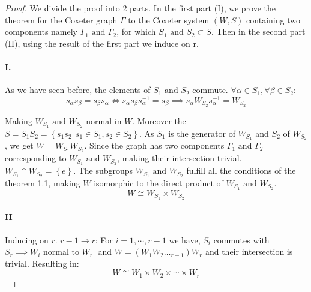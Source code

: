 \documentclass[11pt]{article}
\theoremstyle{plain}
\begin{document}
\begin{proof}
	We divide the proof into 2 parts. In the first part (I), we prove the theorem for the Coxeter graph $ \Gamma $  to the Coxeter system 
	$ \left( W,S \right) $ containing two components namely $ \Gamma_1 \text{ and } \Gamma_2 $, for which $ S_1 \text{ and } S_2 \subset S $.
	Then in the second part (II), using the result of the first part we induce on r. 
\paragraph{I.} As we have seen before, the elements of $ S_1 \text{ and } S_2 $ commute. $ \forall \alpha \in S_1, \forall \beta \in S_2: $
	$$
	s_{\alpha } s_{\beta } = s_{\beta } s_{\alpha } \iff s_{\alpha } s_{\beta } s_{\alpha }^{-1} = s_{\beta } \implies 
	s_{\alpha } W_{S_2} s_{\alpha }^{-1} = W_{S_2}
	$$

Making $ W_{S_1} \text{ and } W_{S_2}  $ normal in $ W $. Moreover the $ S = S_1S_2 = \left\{ 
	s_1 s_2 |\, s_1 \in S_1, s_2 \in S_2\right\}  $. As $ S_1 $ is the generator of $ W_{S_1} $ and $ S_2 $ of $ W_{S_2} $, we get $ W = W_{S_1} W_{S_2} $. 
	Since the graph has two components $ \Gamma_1 \text{ and } \Gamma_2 $ corresponding to $ W_{S_1} \text{ and } W_{S_2} $, making their 
	intersection trivial. $ W_{S_1} \cap W_{S_2} = \left\{ e \right\} $. The subgroups $ W_{S_1} \text{ and } W_{S_2}$ fulfill all the conditions of 
	the theorem 1.1, making $ W $ isomorphic to the direct product of $ W_{S_1} \text{ and } W_{S_2} $. 
	$$ W \cong W_{S_1} \times W_{S_2} $$
	\paragraph{II}
	Inducing on $ r $. $ r -1 \to r $: For $ i = 1 , \cdots,  r-1   $   we have, $ S_i $ commutes with $ S_r \implies W_i $ normal to $ W_r \; $ and $ W = \left( W_1 W_2 \ldots _{r-1} \right) W_{r} $ and their intersection is trivial. Resulting in: 
	$$ W \cong W_1 \times W_2 \times \cdots \times W_{r}$$
\end{proof}
\end{document}
